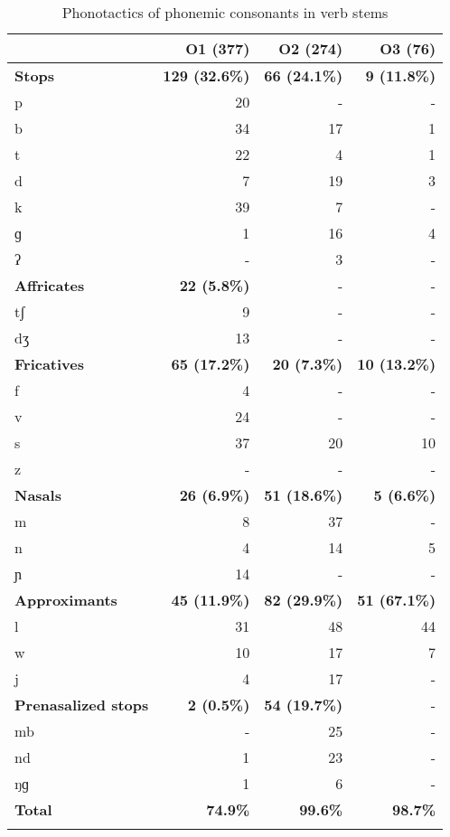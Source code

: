 \begin{table}
\begin{tabularx}{\textwidth}{Xrrr}
 \lsptoprule
 & O1 (377) & O2 (274) &  O3 (76)    \\  \midrule
{\bfseries Stops}  & {\bfseries 129 (32.6\%)} & {\bfseries 66 (24.1\%)}  & {\bfseries 9 (11.8\%)}   \\ 
        p & 20  & -  &  -   \\ 
         b  & 34   & 17 & 1    \\
          t  &  22   &  4  &  1 \\
        d   & 7   &  19  &  3  \\
         k  &  39   &  7   &  -  \\
          ɡ &  1   & 16  & 4  \\
         ʔ  &   -   & 3   & -   \\  \midrule
{\bfseries Affricates}  & {\bfseries 22 (5.8\%)}  & - & - \\ 
	tʃ &    9 &  -  & - \\
	dʒ &  13  &  -  & -    \\   \midrule
{\bfseries Fricatives}  & {\bfseries 65 (17.2\%)} & {\bfseries 20 (7.3\%)} & {\bfseries 10 (13.2\%)}  \\
           f & 4 &  -  &  - \\ 
           v &  24  &  -  & -  \\ 
          s  &  37    & 20   &  10 \\
         z  &  -  &  -  &  - \\  \midrule
{\bfseries Nasals}  & {\bfseries 26 (6.9\%)} & {\bfseries 51 (18.6\%)}  & {\bfseries  5 (6.6\%)}   \\
         m &  8  &  37   &  - \\ 
         n  &  4   &  14   & 5 \\
         ɲ  &  14  &  -  &  - \\  \midrule
{\bfseries Approximants}  & {\bfseries 45 (11.9\%)} & {\bfseries 82 (29.9\%)}  & {\bfseries  51 (67.1\%)}  \\
           l &   31  & 48   &  44 \\
           w & 10   &   17  &  7 \\
           j  &  4  & 17  & -  \\  \midrule	
{\bfseries Prenasalized stops}  & {\bfseries 2 (0.5\%)}   & {\bfseries 54  (19.7\%)} & -  \\
	mb   & - & 25 & -  \\
	nd    & 1 & 23 &  - \\
	ŋɡ 	& 1  & 6  & -  \\  \midrule
{\bfseries Total} & {\bfseries 74.9\%} & {\bfseries 99.6\%} & {\bfseries 98.7\%} \\  \lspbottomrule
\end{tabularx}
\caption{Phonotactics of phonemic consonants in verb stems}
\label{Tab:PhonotactV}
\end{table}

